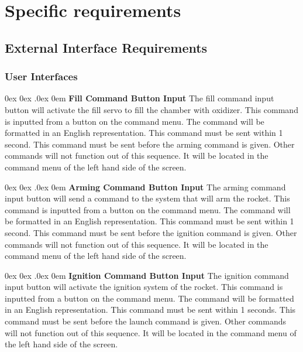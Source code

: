 \documentclass[10pt,draftclsnofoot,onecolumn,compsoc]{IEEEtran}
\makeatletter
\renewcommand\paragraph{\@startsection{paragraph}{4}{\z@}%
                                    {0ex \@plus0ex \@minus.0ex}%
                                    {0em}%
                                    {\normalfont\normalsize\bfseries}}
\makeatother
\begin{document}
\section{ Specific requirements}
\subsection{External Interface Requirements}
\subsubsection{ User Interfaces}
\paragraph {\bf Fill Command Button Input}
The fill command input button will activate the fill servo to fill the chamber with oxidizer. This command is inputted from a button on the command menu. The command will be formatted in an English representation.  This command must be sent within 1 second. This command must be sent before the arming command is given. Other commands will not function out of this sequence. It will be located in the command menu of the left hand side of the screen.

\paragraph{\bf Arming Command Button Input}
The arming command input button will send a command to the system that will arm the rocket. This command is inputted from a button on the command menu. The command will be formatted in an English representation.  This command must be sent within 1 second. This command must be sent before the ignition command is given. Other commands will not function out of this sequence. It will be located in the command menu of the left hand side of the screen.

\paragraph{\bf Ignition Command Button Input}
The ignition command input button will activate the ignition system of the rocket. This command is inputted from a button on the command menu. The command will be formatted in an English representation.  This command must be sent within 1 seconds. This command must be sent before the launch command is given. Other commands will not function out of this sequence. It will be located in the command menu of the left hand side of the screen.
\end{document}
